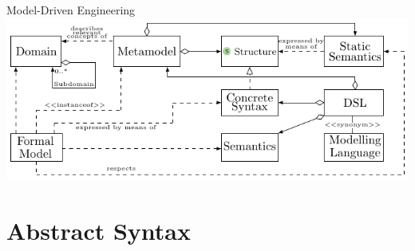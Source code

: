 	\begin{frame}[noframenumbering]{Model-Driven Engineering}
		\includegraphics[width=\textwidth]{tikz/mdsd_concept_2.pdf}
	\end{frame}


	\section{Abstract Syntax}
	
